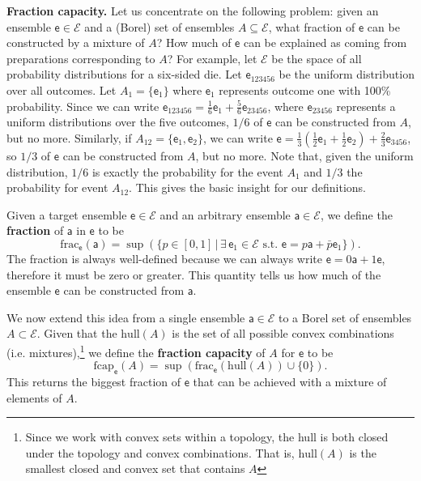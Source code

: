 \documentclass[10pt,twocolumn, nofootinbib]{revtex4-2}
\newcommand\hull{\mathrm{hull}}
\newcommand\fraction{\mathrm{frac}}
\newcommand\frcap{\mathrm{fcap}}
\newcommand{\ens}[1][e] {\mathsf{#1}} %
\newcommand{\Ens}[1][E] {\mathcal{#1}} %
\begin{document}
\textbf{Fraction capacity.} Let us concentrate on the following problem: given an ensemble $\ens \in \Ens$ and a (Borel) set of ensembles $A \subseteq \Ens$, what fraction of $\ens$ can be constructed by a mixture of $A$? How much of $\ens$ can be explained as coming from preparations corresponding to $A$? For example, let $\Ens$ be the space of all probability distributions for a six-sided die. Let $\ens_{123456}$ be the uniform distribution over all outcomes. Let $A_1 = \{\ens_1\}$ where $\ens_1$ represents outcome one with 100\% probability. Since we can write $\ens_{123456} = \frac{1}{6} \ens_{1} + \frac{5}{6} \ens_{23456}$, where $\ens_{23456}$ represents a uniform distributions over the five outcomes, $1/6$ of $\ens$ can be constructed from $A$, but no more. Similarly, if $A_{12} = \{\ens_{1},\ens_{2}\}$, we can write $\ens = \frac{1}{3} \left(\frac{1}{2} \ens_1 + \frac{1}{2} \ens_2 \right)  + \frac{2}{3} \ens_{3456}$, so $1/3$ of $\ens$ can be constructed from $A$, but no more. Note that, given the uniform distribution, $1/6$ is exactly the probability for the event $A_1$ and $1/3$ the probability for event $A_{12}$. This gives the basic insight for our definitions.

Given a target ensemble $\ens \in \Ens$ and an arbitrary ensemble $\ens[a] \in \Ens$, we define the \textbf{fraction} of $\ens[a]$ in $\ens$ to be
\begin{equation}
	\fraction_{\ens}(\ens[a]) = \sup(\{ p \in [0,1] \, | \, \exists \, \ens_1 \in \Ens \text{ s.t. }  \ens = p \ens[a] + \bar{p} \ens_1 \}).
\end{equation}
The fraction is always well-defined because we can always write $\ens = 0 \ens[a] + 1 \ens$, therefore it must be zero or greater. This quantity tells us how much of the ensemble $\ens$ can be constructed from $\ens[a]$. 

We now extend this idea from a single ensemble $\ens[a] \in \Ens$ to a Borel set of ensembles $A \subset \Ens$. Given that the $\hull(A)$ is the set of all possible convex combinations (i.e. mixtures),\footnote{Since we work with convex sets within a topology, the hull is both closed under the topology and convex combinations. That is, $\hull(A)$ is the smallest closed and convex set that contains $A$} we define the \textbf{fraction capacity} of $A$ for $\ens$ to be
\begin{equation}
	\frcap_{\ens}(A) = \sup(\fraction_{\ens}(\hull(A))\cup\{0\}).
\end{equation}
This returns the biggest fraction of $\ens$ that can be achieved with a mixture of elements of $A$.
\end{document}
